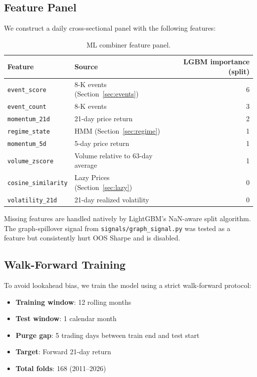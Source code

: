 \documentclass[11pt,a4paper]{article}
\begin{document}
\subsection{Feature Panel}

We construct a daily cross-sectional panel with the following features:

\begin{table}[H]
\centering
\caption{ML combiner feature panel.}
\label{tab:features}
\begin{tabular}{llr}
\toprule
Feature & Source & LGBM importance (split) \\
\midrule
\texttt{event\_score} & 8-K events (Section~\ref{sec:events}) & 6 \\
\texttt{event\_count} & 8-K events & 3 \\
\texttt{momentum\_21d} & 21-day price return & 2 \\
\texttt{regime\_state} & HMM (Section~\ref{sec:regime}) & 1 \\
\texttt{momentum\_5d} & 5-day price return & 1 \\
\texttt{volume\_zscore} & Volume relative to 63-day average & 1 \\
\texttt{cosine\_similarity} & Lazy Prices (Section~\ref{sec:lazy}) & 0 \\
\texttt{volatility\_21d} & 21-day realized volatility & 0 \\
\bottomrule
\end{tabular}
\end{table}

Missing features are handled natively by LightGBM's NaN-aware split algorithm. The graph-spillover signal from \texttt{signals/graph\_signal.py} was tested as a feature but consistently hurt OOS Sharpe and is disabled.

\subsection{Walk-Forward Training}

To avoid lookahead bias, we train the model using a strict walk-forward protocol:
\begin{itemize}[noitemsep]
    \item \textbf{Training window}: 12 rolling months
    \item \textbf{Test window}: 1 calendar month
    \item \textbf{Purge gap}: 5 trading days between train end and test start
    \item \textbf{Target}: Forward 21-day return
    \item \textbf{Total folds}: 168 (2011--2026)
\end{itemize}
\end{document}
